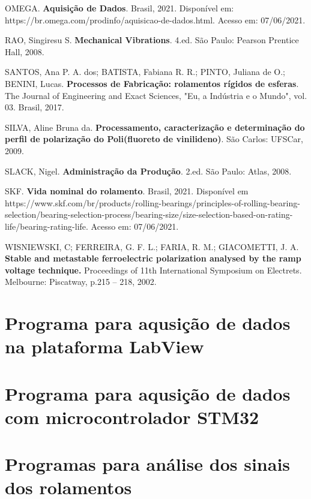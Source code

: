 \documentclass[
	12pt,				
	oneside,			
	a4paper,			
	english,			
	brazil,			
	]{abntex2ppgsi}
\begin{document}
\begin{thebibliography}{9}
 OMEGA.
  \textbf{Aquisição de Dados}.
  Brasil, 2021. Disponível em: https://br.omega.com/prodinfo/aquisicao-de-dados.html. Acesso em: 07/06/2021.

 RAO, Singiresu S.
  \textbf{Mechanical Vibrations}.
  4.ed. São Paulo: Pearson Prentice Hall, 2008.

    SANTOS, Ana P. A. dos; BATISTA, Fabiana R. R.; PINTO, Juliana de O.; BENINI, Lucas.
  \textbf{Processos de Fabricação: rolamentos rígidos de esferas}.
  The Journal of Engineering and Exact Sciences, "Eu, a Indústria e o Mundo", vol. 03. Brasil, 2017.  
  
    SILVA, Aline Bruna da.
  \textbf{Processamento, caracterização e determinação do perfil de polarização do Poli(fluoreto de vinilideno)}.
  São Carlos: UFSCar, 2009.

 SLACK, Nigel.
  \textbf{Administração da Produção}.
  2.ed. São Paulo: Atlas, 2008.
  
 SKF.
  \textbf{Vida nominal do rolamento}.
  Brasil, 2021. Disponível em https://www.skf.com/br/products/rolling-bearings/principles-of-rolling-bearing-selection/bearing-selection-process/bearing-size/size-selection-based-on-rating-life/bearing-rating-life. Acesso em: 07/06/2021.

    WISNIEWSKI, C; FERREIRA, G. F. L.; FARIA, R. M.; GIACOMETTI, J. A.
  \textbf{Stable and metastable ferroelectric polarization analysed by the ramp voltage technique.}
  Proceedings of 11th International Symposium on Electrets. Melbourne: Piscatway, p.215 – 218, 2002.


\end{thebibliography}


%
%

\begin{apendicesenv}

\chapter{Programa para aqusição de dados na plataforma LabView}


\chapter{Programa para aqusição de dados com microcontrolador STM32}


\chapter{Programas para análise dos sinais dos rolamentos}

\end{apendicesenv}
\end{document}
